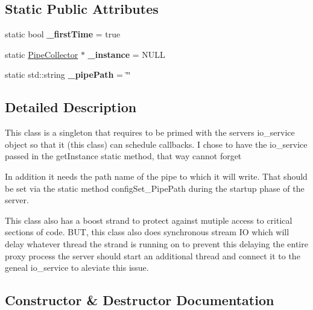 \subsection*{Static Public Attributes}
\begin{DoxyCompactItemize}
\item 
\mbox{\label{class_pipe_collector_ab599c19550e7b7d2534231c9e9d61375}} 
static bool {\bfseries \+\_\+first\+Time} = true
\item 
\mbox{\label{class_pipe_collector_af8c74d185ce54c2193ec8f42ef099698}} 
static \hyperlink{class_pipe_collector}{Pipe\+Collector} $\ast$ {\bfseries \+\_\+instance} = N\+U\+LL
\item 
\mbox{\label{class_pipe_collector_a1bbb1d5bd4d23738cc0e90e0a8644f55}} 
static std\+::string {\bfseries \+\_\+pipe\+Path} = \char`\"{}\char`\"{}
\end{DoxyCompactItemize}


\subsection{Detailed Description}
This class is a singleton that requires to be primed with the servers io\+\_\+service object so that it (this class) can schedule callbacks. I chose to have the io\+\_\+service passed in the get\+Instance static method, that way cannot forget

In addition it needs the path name of the pipe to which it will write. That should be set via the static method config\+Set\+\_\+\+Pipe\+Path during the startup phase of the server.

This class also has a boost strand to protect against mutiple access to critical sections of code. B\+UT, this class also does synchronous stream IO which will delay whatever thread the strand is running on to prevent this delaying the entire proxy process the server should start an additional thread and connect it to the geneal io\+\_\+service to aleviate this issue. 

\subsection{Constructor \& Destructor Documentation}
\mbox{\label{class_pipe_collector_ad2a04b5f8e95e204cfe1d85bded0c92d}} 
